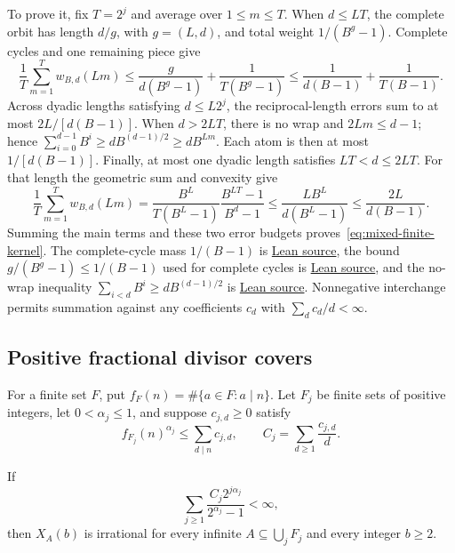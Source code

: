 \documentclass[11pt]{article}
\begin{document}
To prove it, fix $T=2^j$ and average over $1\le m\le T$.
When $d\le LT$, the complete orbit has length $d/g$, with $g=(L,d)$,
and total weight $1/(B^g-1)$.  Complete cycles and one remaining piece give
\[
 \frac1T\sum_{m=1}^T w_{B,d}(Lm)
 \le\frac{g}{d(B^g-1)}+\frac1{T(B^g-1)}
 \le\frac1{d(B-1)}+\frac1{T(B-1)}.
\]
Across dyadic lengths satisfying $d\le L2^j$, the reciprocal-length
errors sum to at most $2L/[d(B-1)]$.
When $d>2LT$, there is no wrap and $2Lm\le d-1$; hence
$\sum_{i=0}^{d-1}B^i\ge dB^{(d-1)/2}\ge dB^{Lm}$.
Each atom is then at most $1/[d(B-1)]$.
Finally, at most one dyadic length satisfies $LT<d\le2LT$.
For that length the geometric sum and convexity give
\[
 \frac1T\sum_{m=1}^T w_{B,d}(Lm)
 =\frac{B^L}{T(B^L-1)}\frac{B^{LT}-1}{B^d-1}
 \le\frac{LB^L}{d(B^L-1)}
 \le\frac{2L}{d(B-1)}.
\]
Summing the main terms and these two error budgets proves~\eqref{eq:mixed-finite-kernel}.
The complete-cycle mass $1/(B-1)$ is
\href{https://github.com/wcook04/plectis-erdos/blob/f36a98bf3d3e6f65f1074e3b800e3293d5b8a51a/ErdosProblems/Erdos257/PaperCompleteR7/CoverKernel.lean#L150}{Lean source}, the bound
$g/(B^g-1)\le1/(B-1)$ used for complete cycles is
\href{https://github.com/wcook04/plectis-erdos/blob/f36a98bf3d3e6f65f1074e3b800e3293d5b8a51a/ErdosProblems/Erdos257/PaperCompleteR7/CoverKernel.lean#L140}{Lean source}, and the no-wrap
inequality $\sum_{i<d}B^i\ge dB^{(d-1)/2}$ is
\href{https://github.com/wcook04/plectis-erdos/blob/f36a98bf3d3e6f65f1074e3b800e3293d5b8a51a/ErdosProblems/Erdos257/PaperCompleteR7/CoverKernel.lean#L343}{Lean source}.
Nonnegative interchange permits summation against any coefficients $c_d$
with $\sum_dc_d/d<\infty$.

\subsection{Positive fractional divisor covers}
For a finite set $F$, put $f_F(n)=\#\{a\in F:a\mid n\}$.
Let $F_j$ be finite sets of positive integers, let $0<\alpha_j\le1$, and
suppose $c_{j,d}\ge0$ satisfy
\[
 f_{F_j}(n)^{\alpha_j}\le\sum_{d\mid n}c_{j,d},\qquad
 C_j=\sum_{d\ge1}\frac{c_{j,d}}d.
\]

\begin{theorem}\label{thm:variable-fractional-cover}
If
\[
 \sum_{j\ge1}\frac{C_j2^{j\alpha_j}}{2^{\alpha_j}-1}<\infty,
 \tag{V}\label{eq:strengthened-cover}
\]
then $X_A(b)$ is irrational for every infinite
$A\subseteq\bigcup_jF_j$ and every integer $b\ge2$.
\end{theorem}
\end{document}
